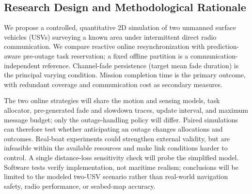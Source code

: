 \subsection{Research Design and Methodological Rationale}

We propose a controlled, quantitative 2D simulation of two unmanned surface vehicles (USVs) surveying a known area under intermittent direct radio communication. We compare reactive online resynchronization with prediction-aware pre-outage task reservation; a fixed offline partition is a communication-independent reference. Channel-fade persistence (target mean fade duration) is the principal varying condition. Mission completion time is the primary outcome, with redundant coverage and communication cost as secondary measures.

The two online strategies will share the motion and sensing models, task allocator, pre-generated fade and slowdown traces, update interval, and maximum message budget; only the outage-handling policy will differ. Paired simulations can therefore test whether anticipating an outage changes allocations and outcomes. Real-boat experiments could strengthen external validity, but are infeasible within the available resources and make link conditions harder to control. A single distance-loss sensitivity check will probe the simplified model. Software tests verify implementation, not maritime realism; conclusions will be limited to the modeled two-USV scenario rather than real-world navigation safety, radio performance, or seabed-map accuracy.
